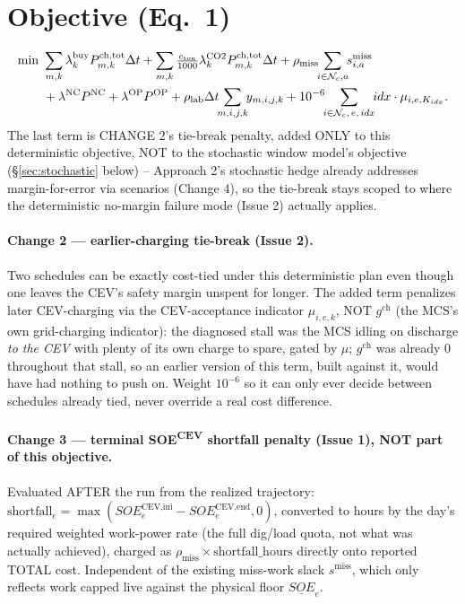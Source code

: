 \documentclass[11pt]{article}
\newcommand{\dt}{\Delta t}
\begin{document}
\section{Objective (Eq.\ 1)}
\begin{align}
\min\ &\sum_{m,k}\lambda^{\text{buy}}_{k}P^{\text{ch,tot}}_{m,k}\dt
      +\sum_{m,k}\tfrac{c_{\text{ton}}}{1000}\lambda^{\text{CO2}}_{k}P^{\text{ch,tot}}_{m,k}\dt
      +\rho_{\text{miss}}\!\!\sum_{i\in\mathcal{N}_c,a}\!\! s^{\text{miss}}_{i,a}\notag\\
     &+\lambda^{\text{NC}}P^{\text{NC}}+\lambda^{\text{OP}}P^{\text{OP}}
      +\rho_{\text{lab}}\dt\!\!\sum_{m,i,j,k}\!\! y_{m,i,j,k}
      +10^{-6}\!\!\sum_{i\in\mathcal{N}_c,\,e,\,idx}\!\! idx\cdot \mu_{i,e,K_{idx}}.
\end{align}
The last term is CHANGE 2's tie-break penalty, added ONLY to this deterministic objective, NOT to
the stochastic window model's objective (\S\ref{sec:stochastic} below) -- Approach 2's stochastic
hedge already addresses margin-for-error via scenarios (Change 4), so the tie-break stays scoped to
where the deterministic no-margin failure mode (Issue 2) actually applies.

\paragraph{Change 2 --- earlier-charging tie-break (Issue 2).} Two schedules can be exactly
cost-tied under this deterministic plan even though one leaves the CEV's safety margin unspent for
longer. The added term penalizes later CEV-charging via the CEV-acceptance indicator
$\mu_{i,e,k}$, NOT $g^{\text{ch}}$ (the MCS's own grid-charging indicator): the diagnosed stall was
the MCS idling on discharge \emph{to the CEV} with plenty of its own charge to spare, gated by
$\mu$; $g^{\text{ch}}$ was already 0 throughout that stall, so an earlier version of this term,
built against it, would have had nothing to push on. Weight $10^{-6}$ so it can only ever decide
between schedules already tied, never override a real cost difference.

\paragraph{Change 3 --- terminal SOE\textsuperscript{CEV} shortfall penalty (Issue 1), NOT part of
this objective.} Evaluated AFTER the run from the realized trajectory:
$\text{shortfall}_e=\max(SOE^{\text{CEV,ini}}_e-SOE^{\text{CEV,end}}_e,0)$, converted to hours by
the day's required weighted work-power rate (the full dig/load quota, not what was actually
achieved), charged as
$\rho_{\text{miss}}\times\text{shortfall\_hours}$ directly onto reported TOTAL cost. Independent of
the existing miss-work slack $s^{\text{miss}}$, which only reflects work capped live against the
physical floor $\underline{SOE}_e$.
\end{document}
